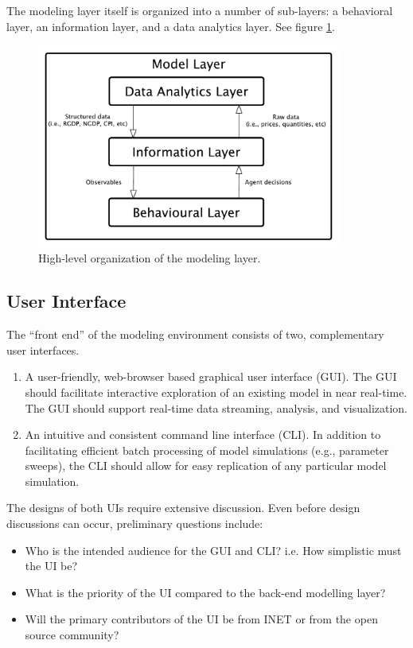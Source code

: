 \documentclass[a4paper]{article}
\begin{document}
The modeling layer itself is organized into a number of sub-layers: a behavioral layer, an information layer, and a data analytics layer. See figure \ref{img-figure-2}.
\begin{figure}[H]\label{img-figure-2}
\centering
\includegraphics[width=10cm]{img/coarse-grain-model-layer.pdf}
\caption{High-level organization of the modeling layer.}
\end{figure}

\subsection{User Interface}

The ``front end'' of the modeling environment consists of two, complementary user interfaces.

\begin{enumerate}
    \item A user-friendly, web-browser based graphical user interface (GUI). The GUI should facilitate interactive exploration of an existing model in near real-time.  The GUI should support real-time data streaming, analysis, and visualization.
    \item An intuitive and consistent command line interface (CLI). In addition to facilitating efficient batch processing of model simulations (e.g., parameter sweeps), the CLI should allow for easy replication of any particular model simulation.
\end{enumerate}

The designs of both UIs require extensive discussion. Even before design discussions can occur, preliminary questions include: 

\begin{itemize}
     \item Who is the intended audience for the GUI and CLI? i.e. How simplistic must the UI be?
     \item What is the priority of the UI compared to the back-end modelling layer?
     \item Will the primary contributors of the UI be from INET or from the open source community?  
    \end{itemize}
  
\end{document}
